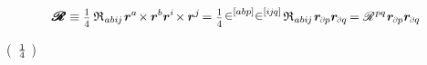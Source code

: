 \begin{otherlanguage}{russian}
\begin{equation*}
\hspace{.1ex}\pmb{\scalebox{1.2}[1]{$\mathscr{R}$}} \equiv
\smalldisplaystyleonefourth \hspace{.4ex} \mathfrak{R}_{\hspace{.1ex}abi\hspace{-0.1ex}j} \hspace{.2ex} \locationvector^a \hspace{-0.33ex} \times \hspace{-0.1ex} \locationvector^b \locationvector^i \hspace{-0.33ex} \times \hspace{-0.1ex} \locationvector^j \hspace{-0.25ex}
= \smalldisplaystyleonefourth \hspace{.15ex} \permutationsparitysymbolsupper{abp} \permutationsparitysymbolsupper{i\hspace{-0.1ex}j\hspace{-0.1ex}q} \hspace{.25ex} \mathfrak{R}_{\hspace{.1ex}abi\hspace{-0.1ex}j} \hspace{.2ex} \locationvector_\differentialindex{p} \locationvector_\differentialindex{q} \hspace{-0.2ex}
= \mathscr{R}^{\hspace{.1ex}pq} \hspace{.1ex} \locationvector_\differentialindex{p} \locationvector_\differentialindex{q}
\end{equation*}

\vspace{-0.2em} \noindent
(~$\onefourth$ ) 


\end{otherlanguage}
